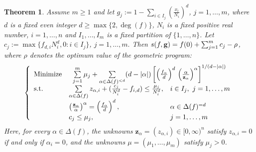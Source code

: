 \documentclass{amsart}
\newtheorem{thm}{Theorem}[section]
\theoremstyle{definition}
\begin{document}
\begin{thm} \label{the algorithm} Assume $m\ge 1$ and let $g_j := 1-\sum_{i\in I_j} (\frac{x_i}{N_i})^d$, $j=1,\dots,m$, where $d$ is a fixed even integer $d \ge \max\{ 2, \deg(f)\}$, $N_i$ is a fixed positive real number, $i=1,\dots, n$ and  $I_1,\dots, I_m$ is a fixed partition of $\{ 1,\dots,n\}$. Let $c_j := \max\{ f_{d,i}N_i^d, 0 : i \in I_j\}$,  $j=1,\dots, m.$ Then $s(f,{\bf g}) = f(0)+\sum_{j=1}^m c_j - \rho$, where $\rho$ denotes the optimum value of the geometric program:
\begin{equation}
\label{lw3}
\left\{\begin{array}{lll}
	\textrm{Minimize} & \multicolumn{2}{c}{\sum\limits_{j=1}^m \mu_j+ \sum\limits_{\alpha\in\Delta(f)^{<d}}(d-\vert\alpha\vert)\left[
	 \left(\frac{f_\alpha}{d}\right)^{d}\,\left(\frac{\alpha}{\mathbf{z}_\alpha}\right)^\alpha
	\right]^{1/(d-\vert\alpha\vert)}}\\
	\textrm{\mbox{s.t.}} & \sum\limits_{\alpha\in\Delta(f)}z_{\alpha,i}+(\frac{c_j}{N_i^d}-f_{i,d}) \le \frac{\mu_j}{N_i^d}, & i \in I_j, \ j=1,\ldots,m\\
	& \left(\frac{\mathbf{z}_\alpha}{\alpha}\right)^\alpha = \left(\frac{f_\alpha}{d}\right)^{d}, & \alpha\in\Delta(f)^{=d}\\
	& c_j \le \mu_j, & j=1,\dots,m
\end{array}\right.
\end{equation}
%
Here, for every $\alpha\in\Delta(f)$, the unknowns $\mathbf{z}_\alpha = (z_{\alpha,i})\in[0,\infty)^n$ satisfy $z_{\alpha,i}= 0$ if and only if $\alpha_i=0$, and the unknowns $\mu = (\mu_1,\dots,\mu_m)$ satisfy $\mu_j> 0$.
\end{thm}
\end{document}
